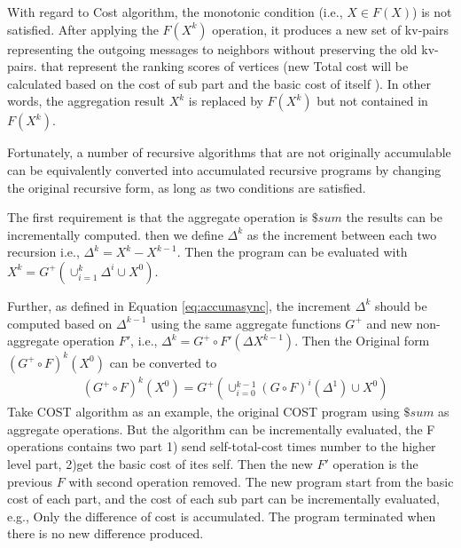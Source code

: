 With regard to Cost algorithm, the monotonic condition (i.e., $X\in F(X)$) is not satisfied. After applying the $F(X^{k})$ operation, it produces a new set of kv-pairs representing the outgoing messages to neighbors  without preserving the old kv-pairs. {\color{green}that represent the ranking scores of vertices} (new Total cost  will be calculated based on the cost of sub part and the basic cost of itself ). In other words, the aggregation result $X^{k}$ is replaced by $F(X^{k})$ but not contained in $F(X^{k})$.

Fortunately, a number of recursive algorithms that are not originally accumulable can be equivalently converted into accumulated recursive programs by changing the original recursive form, as long as two conditions are satisfied.


{\color{red}

The first requirement is that{\color{blue} the aggregate operation is $\$sum$ } the results can be incrementally computed. then we define $\Delta^{k}$ as the increment between each two recursion i.e., $\Delta^{k}=X^k-X^{k-1}$. Then the program can be evaluated with $X^k=G^+(\cup_{i=1}^{k}\Delta^i\cup X^0)$.

Further, as defined in Equation \ref{eq:accumasync}, the increment $\Delta^{k}$ should be computed based on $\Delta^{k-1}$ using the same aggregate functions $G^+$ and new non-aggregate operation $F'$, i.e., $\Delta^{k}=G^+\circ F'(\Delta X^{k-1})$.
Then the Original form $(G^+\circ F)^k(X^0)$ can be converted to
\begin{equation}
\label{eq:convertform}
\begin{aligned}
&(G^+\circ F)^k(X^0)
=G^+( \cup_{i=0}^{k-1}{(G\circ F)^i(\Delta^{1})\cup X^0})
\end{aligned}
\end{equation}
Take COST algorithm as an example, the original COST program using $\$sum$ as aggregate operations. But the algorithm can be incrementally evaluated, the F operations contains two part 1) send self-total-cost times number to the higher level part, 2)get the basic cost of ites self.  Then the new $F'$ operation is the previous $F$ with second operation removed. The new program start from the basic cost of each part, and the cost of each sub part can be incrementally evaluated, e.g., Only the difference of cost is accumulated. The program terminated when there is no new difference produced.

}
